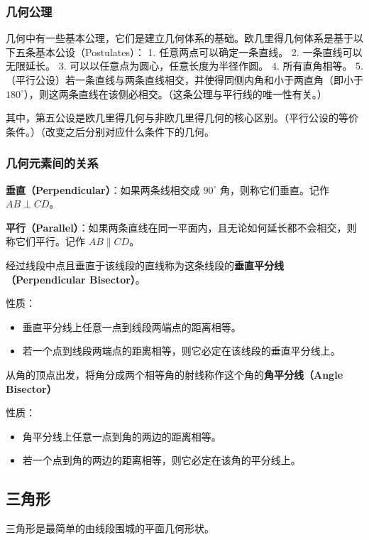 \subsubsection{几何公理}

几何中有一些基本公理，它们是建立几何体系的基础。欧几里得几何体系是基于以下五条基本公设（Postulates）：
	1.	任意两点可以确定一条直线。
	2.	一条直线可以无限延长。
	3.	可以以任意点为圆心，任意长度为半径作圆。
	4.	所有直角相等。
	5.	（平行公设）若一条直线与两条直线相交，并使得同侧内角和小于两直角（即小于 $180^\circ$），则这两条直线在该侧必相交。（这条公理与平行线的唯一性有关。）

其中，第五公设是欧几里得几何与非欧几里得几何的核心区别。（平行公设的等价条件。）（改变之后分别对应什么条件下的几何。

\subsubsection{几何元素间的关系}

\textbf{垂直（Perpendicular）}：如果两条线相交成 $90^\circ$ 角，则称它们垂直。记作 $AB \perp CD$。

\textbf{平行（Parallel）}：如果两条直线在同一平面内，且无论如何延长都不会相交，则称它们平行。记作 $AB \parallel CD$。


经过线段中点且垂直于该线段的直线称为这条线段的\textbf{垂直平分线（Perpendicular Bisector）}。

性质：
\begin{itemize}
    \item 垂直平分线上任意一点到线段两端点的距离相等。
    \item 若一个点到线段两端点的距离相等，则它必定在该线段的垂直平分线上。
\end{itemize}

从角的顶点出发，将角分成两个相等角的射线称作这个角的\textbf{角平分线（Angle Bisector）}

性质：
\begin{itemize}
    \item 角平分线上任意一点到角的两边的距离相等。
    \item 若一个点到角的两边的距离相等，则它必定在该角的平分线上。
\end{itemize}


\subsection{三角形}

三角形是最简单的由线段围城的平面几何形状。

